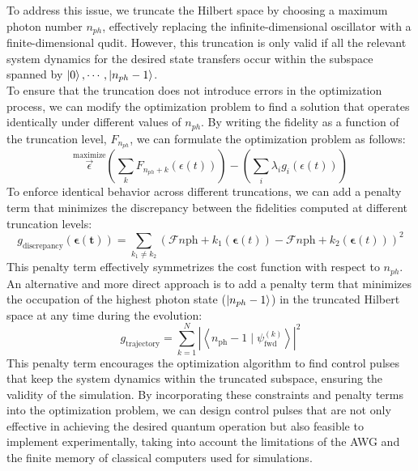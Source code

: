 \documentclass[12pt]{report}
\begin{document}
To address this issue, we truncate the Hilbert space by choosing a maximum photon number $n_{ph}$, effectively replacing the infinite-dimensional oscillator with a finite-dimensional qudit.
However, this truncation is only valid if all the relevant system dynamics for the desired state transfers occur within the subspace spanned by ${\ket{0}, \cdots, \ket{n_{ph} - 1}}$.
\\
To ensure that the truncation does not introduce errors in the optimization process, we can modify the optimization problem to find a solution that operates identically under different values of $n_{ph}$. 
By writing the fidelity as a function of the truncation level, $F_{n_{ph}}$, we can formulate the optimization problem as follows:
\begin{equation}
    \stackrel{\text{maximize}}{\vec{\epsilon}} \left( \sum_k F_{n_{ph}+k} (\epsilon(t)) \right) - \left( \sum_i \lambda_i g_i (\epsilon(t)) \right)
\end{equation}
To enforce identical behavior across different truncations, we can add a penalty term that minimizes the discrepancy between the fidelities computed at different truncation levels:
\begin{equation*}
    g_{\text{discrepancy}}(\boldsymbol{\epsilon}(\boldsymbol{t}))=\sum_{k_1 \neq k_2}\left(\mathcal{F}{n{\mathrm{ph}}+k_1}(\boldsymbol{\epsilon}(t))-\mathcal{F}{n{\mathrm{ph}}+k_2}(\boldsymbol{\epsilon}(t))\right)^2
\end{equation*}
This penalty term effectively symmetrizes the cost function with respect to $n_{ph}$.
An alternative and more direct approach is to add a penalty term that minimizes the occupation of the highest photon state ($\ket{n_{ph} - 1}$) in the truncated Hilbert space at any time during the evolution:
\begin{equation*}
    g_{\text{trajectory}}=\sum_{k=1}^N\left|\left\langle n_{\text{ph}}-1 \mid \psi_{\text{fwd}}^{(k)}\right\rangle\right|^2
\end{equation*}
This penalty term encourages the optimization algorithm to find control pulses that keep the system dynamics within the truncated subspace, ensuring the validity of the simulation.
By incorporating these constraints and penalty terms into the optimization problem, we can design control pulses that are not only effective in achieving the desired quantum operation but also feasible to implement experimentally, taking into account the limitations of the AWG and the finite memory of classical computers used for simulations.
\end{document}
